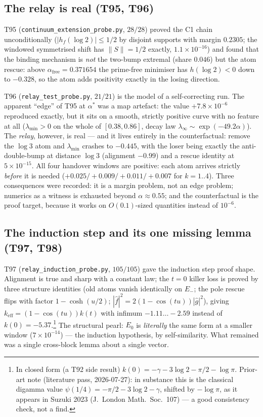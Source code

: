 \documentclass[11pt,a4paper]{article}
\begin{document}
\subsection{The relay is real (T95, T96)}
T95 (\texttt{continuum\_extension\_probe.py}, $28/28$) proved the C1 chain unconditionally
($|h_f(\log2)|\le1/2$ by disjoint supports with margin $0.2305$; the windowed symmetrised shift has
$\|S\|=1/2$ exactly, $1.1\times10^{-16}$) and found that the binding mechanism is \emph{not} the
two-bump extremal (share $0.046$) but the atom rescue: above $\alpha_{\mathrm{free}}=0.371654$ the
prime-free minimiser has $h(\log2)<0$ down to $-0.328$, so the atom adds positivity exactly in the
losing direction.

T96 (\texttt{relay\_test\_probe.py}, $21/21$) is the model of a self-correcting run. The apparent
``edge'' of T95 at $\alpha^*$ was a map artefact: the value $+7.8\times10^{-6}$ reproduced exactly, but
it sits on a smooth, strictly positive curve with no feature at all ($\lambda_{\min}>0$ on the whole of
$[0.38,0.86]$, decay law $\lambda_\infty\sim\exp(-49.2\alpha)$). The \emph{relay}, however, is real ---
and it lives entirely in the counterfactual: remove the $\log3$ atom and $\lambda_{\min}$ crashes to
$-0.445$, with the loser being exactly the anti-double-bump at distance $\log3$ (alignment $-0.99$) and
a rescue identity at $5\times10^{-15}$. All four handover windows are positive: each atom arrives
strictly \emph{before} it is needed ($+0.025/+0.009/+0.011/+0.007$ for $k=1..4$). Three consequences
were recorded: it is a margin problem, not an edge problem; numerics as a witness is exhausted beyond
$\alpha\approx0.55$; and the counterfactual is the proof target, because it works on $O(0.1)$-sized
quantities instead of $10^{-6}$.

\subsection{The induction step and its one missing lemma (T97, T98)}
T97 (\texttt{relay\_induction\_probe.py}, $105/105$) gave the induction step proof shape. Alignment is
true and sharp with a constant law; the $t=0$ killer loss is proved by three structure identities
(old atoms vanish identically on $E_-$; the pole rescue flips with factor $1-\cosh(u/2)$;
$|\hat f|^2=2(1-\cos(tu))|\hat g|^2$), giving $k_{\mathrm{eff}}=(1-\cos(tu))k(t)$ with infimum
$-1.11\ldots-2.59$ instead of $k(0)=-5.37$.\footnote{In closed form (a T92 side result)
$k(0)=-\gamma-3\log2-\pi/2-\log\pi$. Prior-art note (literature pass, 2026-07-27): in substance
this is the classical digamma value $\psi(1/4)=-\pi/2-3\log2-\gamma$, shifted by $-\log\pi$, as it
appears in Suzuki 2023 (J.\ London Math.\ Soc.\ 107) --- a good consistency check, not a find.} The structural pearl: $E_0$ is \emph{literally} the same
form at a smaller window ($7\times10^{-14}$) --- the induction hypothesis, by self-similarity. What
remained was a single cross-block lemma about a single vector.
\end{document}
